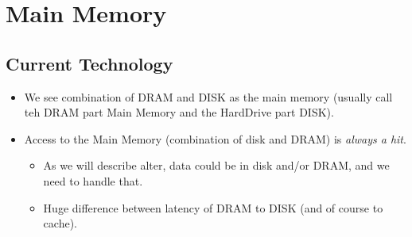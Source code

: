 \documentclass[10pt]{article}
\begin{document}
\section*{Main Memory}
\subsection*{Current Technology}
\begin{itemize}
    \item We see combination of DRAM and DISK as the main memory (usually call teh DRAM part Main Memory and the HardDrive part DISK).
    \item Access to the Main Memory (combination of disk and DRAM) is \textit{always a hit}.
    \begin{itemize}
        \item As we will describe alter, data could be in disk and/or DRAM, and we need to handle that.
        \item Huge difference between latency of DRAM to DISK (and of course to cache).
    \end{itemize}
\end{itemize}
\end{document}
